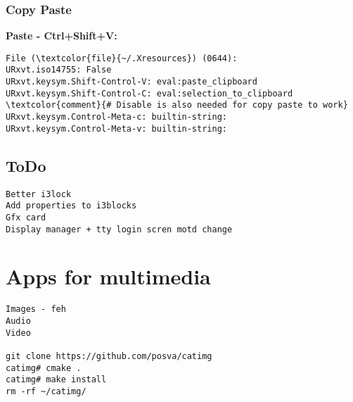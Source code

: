 \documentclass[10pt, a4paper, onecolumn, openany]{book}         %
\begin{document}
\subsubsection{Copy Paste}
\textbf{Paste - Ctrl+Shift+V:}

\begin{Verbatim}[commandchars=\\\{\}]
File (\textcolor{file}{~/.Xresources}) (0644):
URxvt.iso14755: False
URxvt.keysym.Shift-Control-V: eval:paste_clipboard
URxvt.keysym.Shift-Control-C: eval:selection_to_clipboard
\textcolor{comment}{# Disable is also needed for copy paste to work}
URxvt.keysym.Control-Meta-c: builtin-string:
URxvt.keysym.Control-Meta-v: builtin-string:
\end{Verbatim}





\subsection{ToDo}
\begin{Verbatim}[commandchars=\\\{\}]
Better i3lock
Add properties to i3blocks
Gfx card
Display manager + tty login scren motd change
\end{Verbatim}




\section{Apps for multimedia}
\begin{Verbatim}[commandchars=\\\{\}]
Images - feh
Audio
Video

git clone https://github.com/posva/catimg
catimg# cmake .
catimg# make install
rm -rf ~/catimg/
\end{Verbatim}
\end{document}

